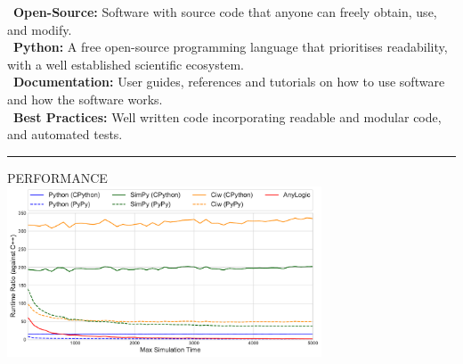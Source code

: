 \documentclass[usenames,dvipsnames,t]{beamer}
\begin{document}
\begin{columns}
\begin{column}{0.5\textwidth}
\begin{center}
  

  \vspace{12mm}

  \begin{minipage}[c]{0.975\textwidth}
    \textbullet\ \textbf{Open-Source:} Software with source code that anyone can freely obtain, use, and modify.\\[3.5mm]
    \textbullet\ \textbf{Python:} A free open-source programming language that prioritises readability, with a well established   scientific ecosystem.\\[3.5mm]
    \textbullet\ \textbf{Documentation:} User guides, references and tutorials on how to use software and how the software works.\\[3.5mm]
    \textbullet\ \textbf{Best Practices:} Well written code incorporating readable and modular code, and automated tests.
  \end{minipage}
\end{center}

\vspace{5mm}
\textcolor{textgrey}{\hrule height 3pt}
\vspace{5mm}

\begin{center}
  \textcolor{textgrey}{\Large{PERFORMANCE}\vspace{4mm}}\\
  \includegraphics[width=0.7\textwidth]{runtimes}
\end{center}

\end{column}


\end{columns}
\end{document}
